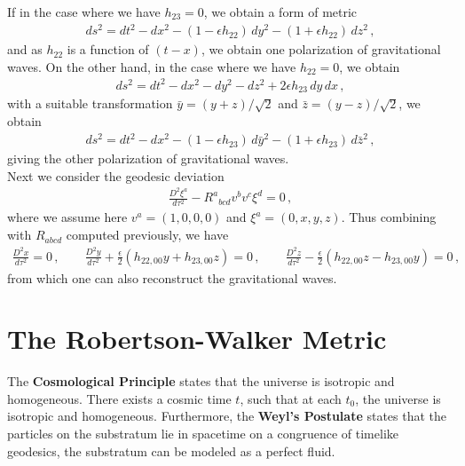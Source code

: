 \documentclass[11pt, onesided]{book}
\theoremstyle{break}
\theoremstyle{break}
\begin{document}
If in the case where we have $h_{23} = 0$, we obtain a form of metric
\begin{align*}
ds^2 = dt^2 - dx^2 - \left(1- \epsilon h_{22}\right)\, dy^2 - (1+\epsilon h_{22})\, dz^2\,,
\end{align*}
and as $h_{22}$ is a function of $(t-x)$, we obtain one polarization of gravitational waves. On the other hand, in the case where we have $h_{22} = 0$, we obtain
\begin{align*}
ds^2 = dt^2 - dx^2 - dy^2 - dz^2 + 2\epsilon h_{23}\, dy\, dx\,,
\end{align*}
with a suitable transformation $\bar{y} = (y+z)/\sqrt{2}$ and $\bar{z} = (y-z) /\sqrt{2}$, we obtain
\begin{align*}
ds^2 = dt^2 - dx^2 - (1-\epsilon h_{23}) \, d\bar{y}^2 - (1+\epsilon  h_{23})\, d\bar{z}^2\,,
\end{align*}
giving the other polarization of gravitational waves. \\

Next we consider the geodesic deviation
\begin{align*}
\frac{D^2 \xi^a}{d\tau^2} -
 R^a{}_{bcd}v^b v^c \xi^d = 0\,, 
\end{align*}
where we assume here $v^a = (1,0,0,0)$ and $\xi^a = (0,x,y,z)$. Thus combining with $R_{abcd}$ computed previously, we have 
\begin{align*}
\frac{D^2 x}{d\tau^2} = 0\,,\qquad
\frac{D^2 y}{d\tau^2} +\frac{\epsilon}{2}\left( h_{22,00}y + h_{23,00}z\right) = 0\,,\qquad
\frac{D^2 z}{d\tau^2} -\frac{\epsilon}{2}\left( h_{22,00}z - h_{23,00}y\right) = 0\,,
\end{align*}
from which one can also reconstruct the gravitational waves.\\

\section[The Robertson-Walker Metric]{\color{red}The Robertson-Walker Metric\color{black}}
The \textbf{Cosmological Principle} states that the universe is isotropic and homogeneous. There exists a cosmic time $t$, such that at each $t_0$, the universe is isotropic and homogeneous. Furthermore, the \textbf{Weyl's Postulate} states that the particles on the substratum lie in spacetime on a congruence of timelike geodesics, the substratum can be modeled as a perfect fluid.\\
\end{document}

